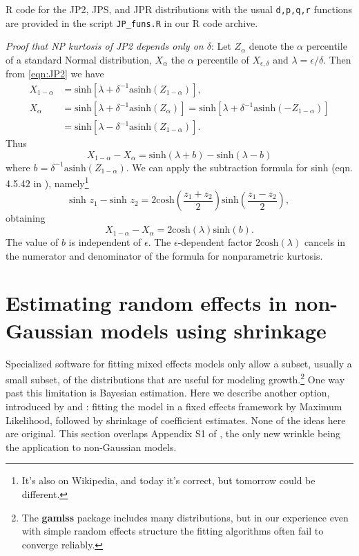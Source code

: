 \documentclass[12pt]{article}
\newcommand{\be}{\begin{equation}}
\newcommand{\ee}{\end{equation}}
\begin{document}
\begin{spacing}{1.35}
	R code for the JP2, JPS, and JPR distributions with the usual \texttt{d,p,q,r} functions are provided 
	in the script \texttt{JP\_funs.R} in our R code archive. 
	
	\emph{Proof that NP kurtosis of JP2 depends only on $\delta$}: 
	Let $Z_\alpha$ denote the $\alpha$ percentile of a standard
	Normal distribution, $X_\alpha$ the $\alpha$ percentile of $X_{\epsilon, \delta}$ and 
	$\lambda =  \epsilon/\delta$. Then from \eqref{eqn:JP2}
	we have 
	\be
	\begin{aligned}
		X_{1-\alpha} & = \mbox{sinh} \left[ \lambda  + \delta^{-1} \mbox{asinh}(Z_{1-\alpha}) \right] ,  \\
		X_{\alpha} & = \mbox{sinh} \left[ \lambda  + \delta^{-1} \mbox{asinh}(Z_{\alpha}) \right]
		= \mbox{sinh} \left[ \lambda + \delta^{-1} \mbox{asinh}(-Z_{1-\alpha}) \right] \\
		& = \mbox{sinh} \left[ \lambda - \delta^{-1} \mbox{asinh}(Z_{1-\alpha}) \right]. 
	\end{aligned}
	\ee
	Thus  
	\be
	X_{1-\alpha} - X_{\alpha} = \mbox{sinh}(\lambda + b) - \mbox{sinh}(\lambda - b)
	\ee
	where $b = \delta^{-1}\mbox{asinh}(Z_{1-\alpha})$. We can apply the subtraction formula for sinh (eqn. 4.5.42
	in \citet{abram-steg}), namely\footnote{It's also on Wikipedia, and today it's correct, but tomorrow could
		be different.}
	\be 
	\mbox{sinh } z_1 - \mbox{sinh } z_2  = 2 \mbox{cosh}\left( \frac{z_1 + z_2}{2}\right) \mbox{sinh}\left( \frac{z_1 - z_2}{2}\right), 
	\ee  
	obtaining 
	\be
	X_{1-\alpha} - X_{\alpha} =  2 \mbox{cosh}(\lambda) \mbox{sinh}(b).
	\ee  
	The value of $b$ is independent of $\epsilon$. The $\epsilon$-dependent factor $2 \mbox{cosh}(\lambda)$ 
	cancels in the numerator and denominator of the formula for nonparametric kurtosis. \scalebox{1.25}{$\square$}
	
	\section{Estimating random effects in non-Gaussian models using shrinkage}
	\label{sec:shrinkageFits}
	Specialized software for fitting mixed effects models only allow a subset, usually a small subset, of the distributions that 
	are useful for modeling growth.\footnote{The \textbf{gamlss} package includes many distributions, but in our experience even with 
		simple random effects structure the fitting algorithms often fail to converge reliably.} One way past this limitation is Bayesian estimation. Here we describe another option, 
	introduced by \citet{link-nichols-1994} and \citet{gould-nichols-1998}: 
	fitting the model in a fixed effects framework by Maximum Likelihood, followed by shrinkage of coefficient estimates. 
	None of the ideas here are original. This section overlaps Appendix S1 of \citet{metcalf-etal-2015}, the only new wrinkle
	being the application to non-Gaussian models.
	

\end{spacing}
\end{document}
